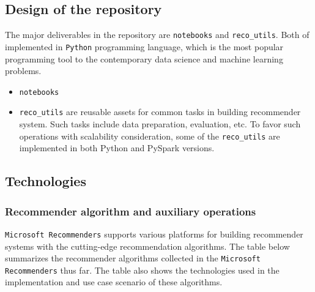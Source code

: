 \documentclass[twoside,11pt]{article}
\begin{document}
\subsection{Design of the repository}
The major deliverables in the repository are \verb|notebooks| and \verb|reco_utils|. Both of implemented in \verb|Python| programming language, which is the most popular programming tool to the contemporary data science and machine learning problems.

\begin{itemize}
 \item \verb|notebooks|
 \item \verb|reco_utils| are reusable assets for common tasks in building recommender system. Such tasks include data preparation, evaluation, etc. To favor such operations with scalability consideration, some of the \verb|reco_utils| are implemented in both Python and PySpark versions.
\end{itemize}

\subsection{Technologies}
\subsubsection{Recommender algorithm and auxiliary operations}
\verb|Microsoft Recommenders| supports various platforms for building recommender systems with the cutting-edge recommendation algorithms. The table below summarizes the recommender algorithms collected in the \verb|Microsoft Recommenders| thus far. The table also shows the technologies used in the implementation and use case scenario of these algorithms.
\end{document}

